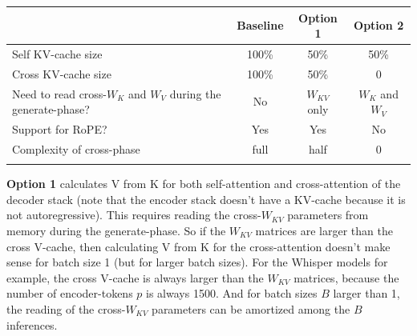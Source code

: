 \documentclass{article}
\def\fline{\Xhline{2\arrayrulewidth}} %
\begin{document}
\begingroup \renewcommand{\arraystretch}{1.3} %
\begin{table}[h!] \centering \begin{tabular}{lccc} \fline
                             & Baseline & Option 1 & Option 2 \\ \hline
  Self KV-cache size         & 100\%    & 50\%     & 50\%     \\
  Cross KV-cache size        & 100\%    & 50\%     & 0        \\
  \makecell[l]{Need to read cross-$W_K$ and $W_V$ \\ during the generate-phase?} & No & $W_{KV}$ only & $W_K$ and $W_V$ \\
  Support for RoPE?          & Yes      & Yes      & No       \\
  Complexity of cross-phase  & full     & half     & 0        \\ \fline
\end{tabular} \end{table} \endgroup

\textbf{Option 1} calculates V from K for both self-attention and cross-attention of the decoder stack (note that the encoder stack doesn’t have a KV-cache because it is not autoregressive). This requires reading the cross-$W_{KV}$ parameters from memory during the generate-phase. So if the $W_{KV}$ matrices are larger than the cross V-cache, then calculating V from K for the cross-attention doesn’t make sense for batch size 1 (but for larger batch sizes). For the Whisper models for example, the cross V-cache is always larger than the $W_{KV}$ matrices, because the number of encoder-tokens $p$ is always 1500. And for batch sizes $B$ larger than 1, the reading of the cross-$W_{KV}$ parameters can be amortized among the $B$ inferences.
\end{document}
